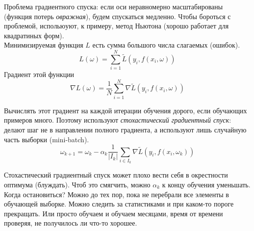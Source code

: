 \documentclass[main.tex]{subfiles}
\begin{document}
Проблема градиентного спуска: если оси неравномерно масштабированы (функция потерь \emph{овражная}), будем спускаться медленно.
Чтобы бороться с проблемой, испольюуют, к примеру, метод Ньютона (хорошо работает для квадратиных форм). \\

Минимизируемая функция $L$ есть сумма большого числа слагаемых (ошибок).
$$ L(\omega) = \sum_{i=1}^{N} \tilde L (y_i, f(x_i, \omega)) $$
Градиент этой функции
$$ \nabla L(\omega) = \frac{1}{N} \sum_{i=1}^{N} \nabla \tilde{L}(y_i, f(x_i, \omega)) $$

Вычислять этот градиент на каждой итерации обучения дорого, если обучающих примеров много.
Поэтому используют \emph{стохастический градиентный спуск}: делают шаг не в направлении полного градиента, а используют лишь случайную часть выборки (mini-batch).
$$ \omega_{k+1} = \omega_k - \alpha_k \frac{1}{|I_k|} \sum_{i \in I_k} \nabla \tilde L (y_i, f(x_i, \omega_k)) $$

Стохастический градиентный спуск может плохо вести себя в окрестности оптимума (блуждать).
Чтоб это смягчить, можно $\alpha_k$ к концу обучения уменьшать. \\

Когда остановиться?
Можно до тех пор, пока не перебрали все элементы в обучающей выборке.
Можно следить за статистиками и при каком-то пороге прекращать.
Или просто обучаем и обучаем месяцами, время от времени проверяя, не получилось ли что-то хорошее.
\end{document}
